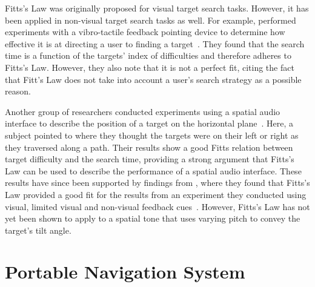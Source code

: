 \documentclass[format=sigconf, review=true, screen=true, anonymous=true]{acmart}
\begin{document}

Fitts's Law was originally proposed for visual target search tasks. However, it has been applied in non-visual target search tasks as well. For example, \citeauthor{ahmaniemi2009augmented} performed experiments with a vibro-tactile feedback pointing device to determine how effective it is at directing a user to finding a target~\cite{ahmaniemi2009augmented}. They found that the search time is a function of the targets' index of difficulties and therefore adheres to Fitts's Law. However, they also note that it is not a perfect fit, citing the fact that Fitt's Law does not take into account a user's search strategy as a possible reason. 

Another group of researchers conducted experiments using a spatial audio interface to describe the position of a target on the horizontal plane~\cite{marentakis2006effects}. Here, a subject pointed to where they thought the targets were on their left or right as they traversed along a path. Their results show a good Fitts relation between target difficulty and the search time, providing a strong argument that Fitts's Law can be used to describe the performance of a spatial audio interface. These results have since been supported by findings from \citeauthor{wu2010fitts}, where they found that Fitts's Law provided a good fit for the results from an experiment they conducted using visual, limited visual and non-visual feedback cues~\cite{wu2010fitts}. However, Fitts's Law has not yet been shown to apply to a spatial tone that uses varying pitch to convey the target's tilt angle.


\section{Portable Navigation System}
\label{sec:portable-navigation}
\end{document}

